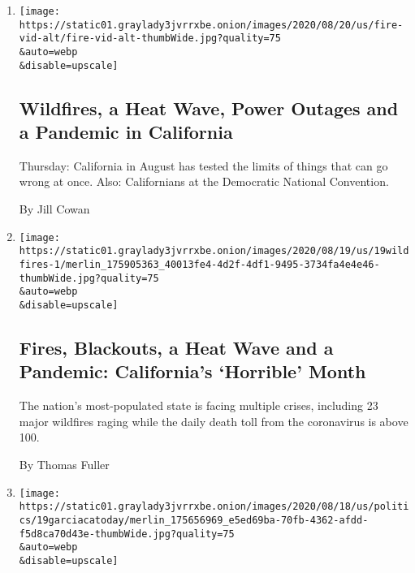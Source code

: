 \begin{enumerate}
\def\labelenumi{\arabic{enumi}.}
\item
  \href{/2020/08/20/us/california-vacaville-complex-fire.html}{}

  \texttt{[image: https://static01.graylady3jvrrxbe.onion/images/2020/08/20/us/fire-vid-alt/fire-vid-alt-thumbWide.jpg?quality=75\\\&auto=webp\\\&disable=upscale]}

  \hypertarget{wildfires-a-heat-wave-power-outages-and-a-pandemic-in-california}{%
  \subsection{Wildfires, a Heat Wave, Power Outages and a Pandemic in
  California}\label{wildfires-a-heat-wave-power-outages-and-a-pandemic-in-california}}

  Thursday: California in August has tested the limits of things that
  can go wrong at once. Also: Californians at the Democratic National
  Convention.

  By Jill Cowan
\item
  \href{/2020/08/19/us/california-heatwave-blackouts-wildfires.html}{}

  \texttt{[image: https://static01.graylady3jvrrxbe.onion/images/2020/08/19/us/19wildfires-1/merlin\_175905363\_40013fe4-4d2f-4df1-9495-3734fa4e4e46-thumbWide.jpg?quality=75\\\&auto=webp\\\&disable=upscale]}

  \hypertarget{fires-blackouts-a-heat-wave-and-a-pandemic-californias-horrible-month}{%
  \subsection{Fires, Blackouts, a Heat Wave and a Pandemic: California's
  `Horrible'
  Month}\label{fires-blackouts-a-heat-wave-and-a-pandemic-californias-horrible-month}}

  The nation's most-populated state is facing multiple crises, including
  23 major wildfires raging while the daily death toll from the
  coronavirus is above 100.

  By Thomas Fuller
\item
  \href{/2020/08/19/us/robert-garcia-dnc.html}{}

  \texttt{[image: https://static01.graylady3jvrrxbe.onion/images/2020/08/18/us/politics/19garciacatoday/merlin\_175656969\_e5ed69ba-70fb-4362-afdd-f5d8ca70d43e-thumbWide.jpg?quality=75\\\&auto=webp\\\&disable=upscale]}

  \hypertarget{california-today}{%
}
\end{enumerate}
